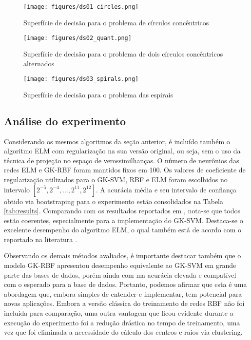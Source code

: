 \documentclass[conference]{IEEEtran}
\begin{document}
	
	\begin{figure}[thpbh]
		\centering
		\texttt{[image: figures/ds01\_circles.png]}
		\caption{Superfície de decisão para o problema de círculos concêntricos}
		\label{fig:ds01_circles}
	\end{figure}
	\begin{figure}[thpbh]
		\centering
		\texttt{[image: figures/ds02\_quant.png]}
		\caption{Superfície de decisão para o problema de dois círculos concêntricos alternados}
		\label{fig:ds02_quant}
	\end{figure}
	\begin{figure}[thpbh]
		\centering
		\texttt{[image: figures/ds03\_spirals.png]}
		\caption{Superfície de decisão para o problema das espirais}
		\label{fig:ds03_spirals}
	\end{figure}

	\subsection{Análise do experimento}

	Considerando os mesmos algoritmos da seção anterior, é incluído também o algoritmo ELM com regularização na sua versão original, ou seja, sem o uso da técnica de projeção no espaço de verossimilhanças. O número de neurônios das redes ELM e GK-RBF foram mantidos fixos em 100. Os valores de coeficiente de regularização utilizados para o GK-SVM, RBF e ELM foram escolhidos no intervalo $[2^{-5},2^{-4}, \dots, 2^{11},2^{12}]$. A acurácia média e seu intervalo de confiança obtido via bootstraping para o experimento estão consolidados na Tabela \ref{tab:results}. Comparando com os resultados reportados em \cite{menezes2019width}, nota-se que todos estão coerentes, especialmente para a implementação do GK-SVM. Destaca-se o excelente desempenho do algoritmo ELM, o qual também está de acordo com o reportado na literatura \cite{huang2011extreme}.
	
	Observando os demais métodos avaliados, é importante destacar também que o modelo GK-RBF apresentou desempenho equivalente ao GK-SVM em grande parte das bases de dados, porém ainda com ma acurácia elevada e compatível com o esperado para a base de dados. Portanto, podemos afirmar que esta é uma abordagem que, embora simples de entender e implementar, tem potencial para novas aplicações. Embora a versão clássica do treinamento de redes RBF não foi incluída para comparação, uma outra vantagem que ficou evidente durante a execução do experimento foi a redução drástica no tempo de treinamento, uma vez que foi eliminada a necessidade do cálculo dos centros e raios via clustering.  
	
\end{document}
